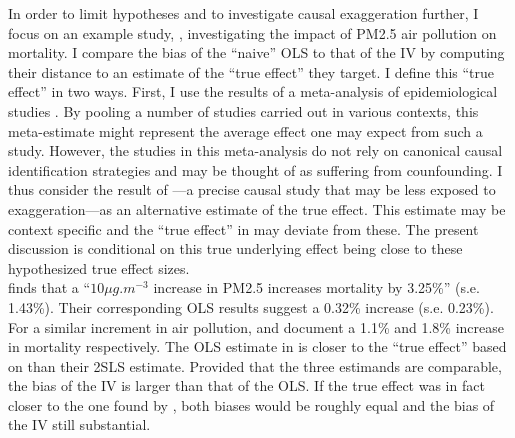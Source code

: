 \documentclass[usletter, 12pt]{article}
\begin{document}
		In order to limit hypotheses and to investigate causal exaggeration further, I focus on an example study, \cite{he_straw_2020}, investigating the impact of PM2.5 air pollution on mortality. I compare the bias of the ``naive'' OLS to that of the IV by computing their distance to an estimate of the ``true effect'' they target. %
		I define this ``true effect'' in two ways. First, I use the results of a meta-analysis of epidemiological studies \citep{shah_short_2015}. By pooling a number of studies carried out in various contexts, this meta-estimate might represent the average effect one may expect from such a study.  However, the studies in this meta-analysis do not rely on canonical causal identification strategies and may be thought of as suffering from counfounding. I thus consider the result of \cite{deryugina_mortality_2019}---a precise causal study that may be less exposed to exaggeration---as an alternative estimate of the true effect. This estimate may be context specific and the ``true effect'' in %
		\cite{he_straw_2020} may deviate from these. 
		The present discussion is conditional on this true underlying effect being close to these hypothesized true effect sizes.\\
		
		\cite{he_straw_2020} finds that a ``$10 \mu g.m^{-3}$ increase in PM2.5 increases mortality by 3.25\%'' (s.e. 1.43\%). Their corresponding OLS results suggest a 0.32\% increase (s.e. 0.23\%). 
For a similar increment in air pollution, \cite{shah_short_2015} and \cite{deryugina_mortality_2019} document a 1.1\% and 1.8\% increase in mortality respectively. The OLS estimate in \cite{he_straw_2020} is closer to the ``true effect'' based on \cite{shah_short_2015} than their 2SLS estimate. Provided that the three estimands are comparable, the bias of the IV is larger than that of the OLS. If the true effect was in fact closer to the one found by \cite{deryugina_mortality_2019}, both biases would be roughly equal and the bias of the IV still substantial.
		
\end{document}
